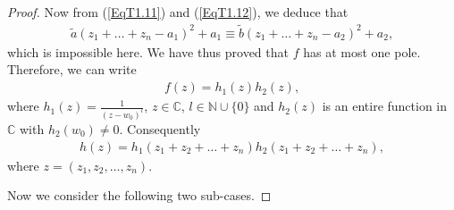 \documentclass[10pt,a4paper]{amsart}
\begin{document}
\begin{proof}
Now from (\ref{EqT1.11}) and (\ref{EqT1.12}), we deduce that
\begin{align*}
\tilde a \left(z_1+\ldots+z_n-a_1\right)^2+a_1\equiv \tilde b\left(z_1+\ldots+z_n-a_2\right)^2+a_2,
\end{align*}
which is impossible here. We have thus proved that $f$ has at most one pole. Therefore, we can write
\begin{align}\label{EqT1.12a}
f(z)=h_1(z)h_2(z),
\end{align}
where $h_1(z)=\frac{1}{(z-w_0)^l}$, $z\in\mathbb{C}$, $l\in\mathbb{N}\cup\{0\}$ and $h_2(z)$ is an entire function in $\mathbb{C}$ with
$h_2(w_0)\neq 0$. Consequently
\begin{align}\label{EqT1.13}
h(z)=h_1(z_1+z_2+\ldots+z_n)h_2(z_1+z_2+\ldots+z_n),
\end{align}
where $z=(z_1,z_2,\ldots,z_n)$.

Now we consider the following two sub-cases.



\end{proof}
\end{document}
